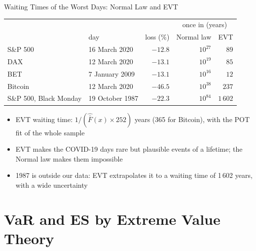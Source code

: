 \begin{frame}{Waiting Times of the Worst Days: Normal Law and EVT}
\itemsize{\footnotesize}
\begin{center}
\footnotesize
\begin{tabular}{llrrr}
\toprule
& & & \multicolumn{2}{c}{once in (years)} \\ & day & loss (\%) & Normal law & EVT \\
\midrule
S\&P 500 & 16 March 2020 & ${-12.8}$ & $10^{27}$ & $89$ \\
DAX & 12 March 2020 & ${-13.1}$ & $10^{19}$ & $85$ \\
BET & 7 January 2009 & ${-13.1}$ & $10^{16}$ & $12$ \\
Bitcoin & 12 March 2020 & ${-46.5}$ & $10^{38}$ & $237$ \\
S\&P 500, Black Monday & 19 October 1987 & $-22.3$ & $10^{84}$ & $1\,602$ \\
\bottomrule
\end{tabular}
\end{center}
\begin{itemize}
    \item EVT waiting time: $1/(\hat{\bar F}(x) \times 252)$ years (365 for Bitcoin), with the POT fit of the whole sample
    \item EVT makes the COVID-19 days rare but plausible events of a lifetime; the Normal law makes them impossible
    \item 1987 is outside our data: EVT extrapolates it to a waiting time of 1\,602 years, with a wide uncertainty
\end{itemize}
\end{frame}


\section{VaR and ES by Extreme Value Theory}


